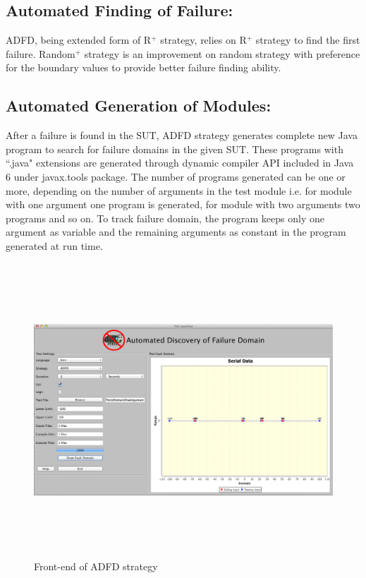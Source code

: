 \subsection{Automated Finding of Failure:}
ADFD, being extended form of R$^+$ strategy, relies on R$^+$ strategy to find the first failure. Random$^+$ strategy is an improvement on random strategy with preference for the boundary values to provide better failure finding ability. %

\subsection{Automated Generation of Modules:}
After a failure is found in the SUT, ADFD strategy generates complete new Java program to search for failure domains in the given SUT.  These programs with ``.java" extensions are generated through dynamic compiler API included in Java 6 under javax.tools package. The number of programs generated can be one or more, depending on the number of arguments in the test module i.e. for module with one argument one program is generated, for module with two arguments two programs and so on. To track failure domain, the program keeps only one argument as variable and the remaining arguments as constant in the program generated at run time.

\begin{figure}[H]
\begin{center}
\includegraphics[width=15cm,height=11cm]{chapter5/ADFD_front_end.png}
\bigskip
\caption{Front-end of ADFD strategy}
\label{fig:ADFD-frontend}
\end{center}
\end{figure}


